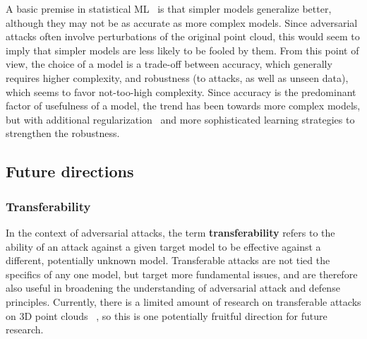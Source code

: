 \documentclass{ieeeaccess}
\begin{document}
A basic premise in statistical ML~\cite{abu-mostafa2012LFD} is that simpler models generalize better, although they may not be as accurate as more complex models. Since adversarial attacks often involve perturbations of the original point cloud, this would seem to imply that simpler models are less likely to be fooled by them. From this point of view, the choice of a model is a trade-off between accuracy, which generally requires higher complexity, and robustness (to attacks, as well as unseen data), which seems to favor not-too-high complexity. Since accuracy is the predominant factor of usefulness of a model, the trend has been towards more complex models, but with additional regularization~\cite{abu-mostafa2012LFD} and more sophisticated learning strategies to strengthen the robustness.





\subsection{Future directions}

\subsubsection{Transferability}
In the context of adversarial attacks, the term \textbf{transferability} refers to the ability of an attack against a given target model to be effective against a different, potentially unknown model. Transferable attacks are not tied the specifics of any one model, but target more fundamental issues, and are therefore also useful in broadening the understanding of adversarial attack and defense principles. Currently, there is a limited amount of research on transferable attacks on 3D point clouds ~\cite{hamdi2020advpc,liu2022boosting,he2023generating,liu2022imperceptible}, so this is one potentially fruitful direction for future research. %
\end{document}
